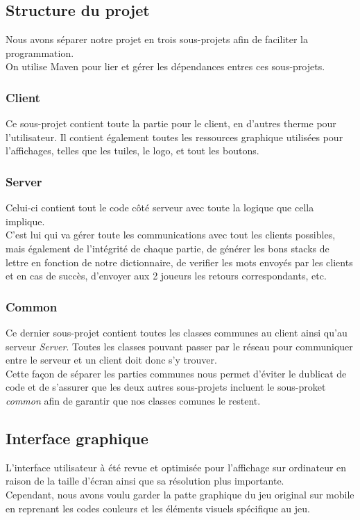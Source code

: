 \documentclass[a4paper,12pt]{article}
\begin{document}
	\subsection{Structure du projet}
	Nous avons 	séparer notre projet en trois sous-projets afin de faciliter la programmation.  \\
	On utilise Maven pour lier et gérer les dépendances entres ces sous-projets.
	
		\subsubsection{Client}
		Ce sous-projet contient toute la partie pour le client, en d'autres therme pour l'utilisateur. Il contient également toutes les ressources graphique utilisées pour l'affichages, telles que les tuiles, le logo, et tout les boutons.
		
		\subsubsection{Server}
		Celui-ci contient tout le code côté serveur avec toute la logique que cella implique. \\
		C'est lui qui va gérer toute les communications avec tout les clients possibles, mais également de l'intégrité de chaque partie, de générer les bons stacks de lettre en fonction de notre dictionnaire, de verifier les mots envoyés par les clients et en cas de succès, d'envoyer aux 2 joueurs les retours correspondants, etc.
		
		\subsubsection{Common}
		Ce dernier sous-projet contient toutes les classes communes au client ainsi qu'au serveur \textit{Server}. Toutes les classes pouvant passer par le réseau pour communiquer entre le serveur et un client doit donc s'y trouver. \\
		Cette façon de séparer les parties communes nous permet d'éviter le dublicat de code et de s'assurer que les deux autres sous-projets incluent le sous-proket \textit{common} afin de garantir que nos classes comunes le restent.
	
	
	\subsection{Interface graphique}
	L'interface utilisateur à été revue et optimisée pour l'affichage sur ordinateur en raison de la taille d'écran ainsi que sa résolution plus importante. \\
	Cependant, nous avons voulu garder la patte graphique du jeu original sur mobile en reprenant les codes couleurs et les éléments visuels spécifique au jeu.
	
\end{document}
